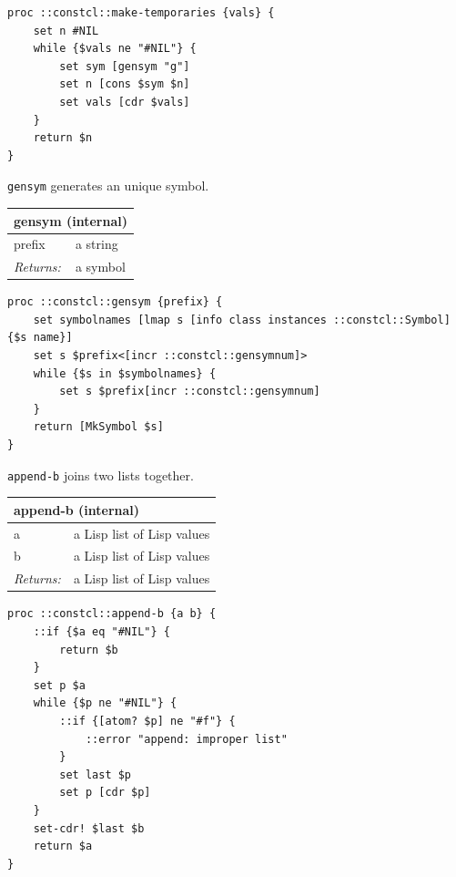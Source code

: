 \documentclass[twoside,9pt]{report}
\begin{document}
\noindent\makebox[\linewidth]{\rule{\linewidth}{0.4pt}}
\begin{lstlisting}
proc ::constcl::make-temporaries {vals} {
    set n #NIL
    while {$vals ne "#NIL"} {
        set sym [gensym "g"]
        set n [cons $sym $n]
        set vals [cdr $vals]
    }
    return $n
}
\end{lstlisting}
\noindent\makebox[\linewidth]{\rule{\linewidth}{0.4pt}}

\texttt{gensym} generates an unique symbol.

\begin{tabular}{ |l l| }
\hline
\multicolumn{2}{|l|}{gensym (internal)} \\
\hline
prefix & a string \\
\textit{Returns:} & a symbol \\
\hline
\end{tabular}

\noindent\makebox[\linewidth]{\rule{\linewidth}{0.4pt}}
\begin{lstlisting}
proc ::constcl::gensym {prefix} {
    set symbolnames [lmap s [info class instances ::constcl::Symbol] {$s name}]
    set s $prefix<[incr ::constcl::gensymnum]>
    while {$s in $symbolnames} {
        set s $prefix[incr ::constcl::gensymnum]
    }
    return [MkSymbol $s]
}
\end{lstlisting}
\noindent\makebox[\linewidth]{\rule{\linewidth}{0.4pt}}

\texttt{append-b} joins two lists together.

\begin{tabular}{ |l l| }
\hline
\multicolumn{2}{|l|}{append-b (internal)} \\
\hline
a & a Lisp list of Lisp values \\
b & a Lisp list of Lisp values \\
\textit{Returns:} & a Lisp list of Lisp values \\
\hline
\end{tabular}

\noindent\makebox[\linewidth]{\rule{\linewidth}{0.4pt}}
\begin{lstlisting}
proc ::constcl::append-b {a b} {
    ::if {$a eq "#NIL"} {
        return $b
    }
    set p $a
    while {$p ne "#NIL"} {
        ::if {[atom? $p] ne "#f"} {
            ::error "append: improper list"
        }
        set last $p
        set p [cdr $p]
    }
    set-cdr! $last $b
    return $a
}
\end{lstlisting}
\noindent\makebox[\linewidth]{\rule{\linewidth}{0.4pt}}
\end{document}
